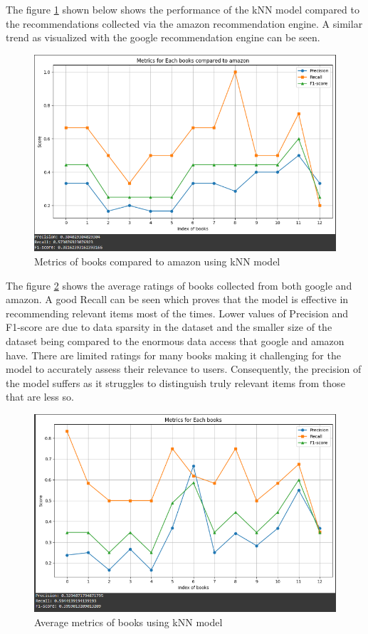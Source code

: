     The figure \ref{Metrics-knn-amazon} shown below shows the performance of the kNN model compared to the recommendations collected via the amazon recommendation engine. A similar trend as visualized with the google recommendation engine can be seen.

    \begin{figure}[h]
        \centering
        \includegraphics[width=1\linewidth]{img/Graphics/knn_amazon.PNG}
        \caption{Metrics of books compared to amazon using kNN model}
        \label{Metrics-knn-amazon}
    \end{figure}

    The figure \ref{Metrics-knn} shows the average ratings of books collected from both google and amazon. A good Recall can be seen which proves that the model is effective in recommending relevant items most of the times. Lower values of Precision and F1-score are due to data sparsity in the dataset and the smaller size of the dataset being compared to the enormous data access that google and amazon have. There are limited ratings for many books making it challenging for the model to accurately assess their relevance to users. Consequently, the precision of the model suffers as it struggles to distinguish truly relevant items from those that are less so.

    \begin{figure}[h]
        \centering
        \includegraphics[width=1\linewidth]{img/Graphics/knn_model.PNG}
        \caption{Average metrics of books using kNN model}
        \label{Metrics-knn}
    \end{figure}
    \newpage

